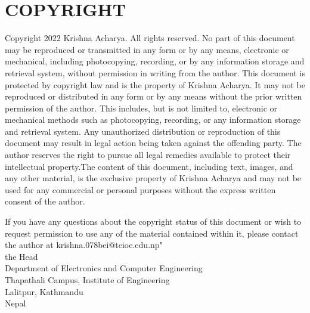 \newpage
{}
\section*{COPYRIGHT}

Copyright 2022 Krishna Acharya. All rights reserved. No part of this document may be reproduced or transmitted in any form or by any means, electronic or mechanical, including photocopying, recording, or by any information storage and retrieval system, without permission in writing from the author. This document is protected by copyright law and is the property of Krishna Acharya. It may not be reproduced or distributed in any form or by any means without the prior written permission of the author. This includes, but is not limited to, electronic or mechanical methods such as photocopying, recording, or any information storage and retrieval system. Any unauthorized distribution or reproduction of this document may result in legal action being taken against the offending party. The author reserves the right to pursue all legal remedies available to protect their intellectual property.The content of this document, including text, images, and any other material, is the exclusive property of Krishna Acharya and may not be used for any commercial or personal purposes without the express written consent of the author.

If you have any questions about the copyright status of this document or wish to request permission to use any of the material contained within it, please contact the author at krishna.078bei@tcioe.edu.np" \\

 the Head \\
 Department of Electronics and Computer Engineering \\
 Thapathali Campus, Institute of Engineering \\
 Lalitpur, Kathmandu \\
 Nepal \\
